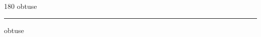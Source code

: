 
\begin{frame}
\begin{center}
\begin{turn}{180}
{\fontsize{2.5cm}{1em}\selectfont obtuse}
\end{turn}
\vspace{1em}\par  
\hrule
\vspace{1em}\par  
{\fontsize{2.5cm}{1em}\selectfont obtuse}
\end{center}
\end{frame}
